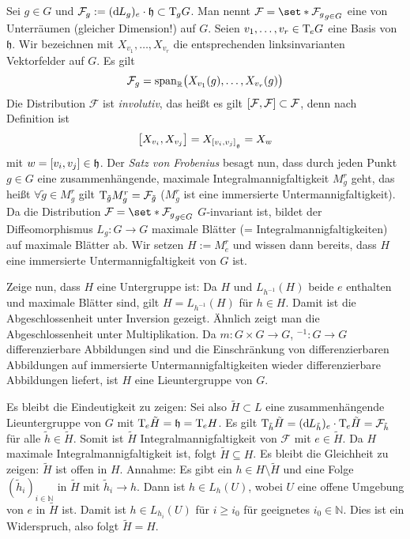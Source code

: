 \begin{beweis}
	Sei $g \in G$ und $\mathcal{F}_g := (\mathd L_g)_e \cdot \mathfrak{h} \subset \Tmap_g G$.
	Man nennt $\mathcal{F} = \set*{\mathcal{F}_g}_{g \in G}$ eine  von Unterräumen (gleicher Dimension!) auf $G$.
	Seien $v_1, \ldots ,v_r \in \Tmap_e G$ eine Basis von $\mathfrak{h}$.
	Wir bezeichnen mit $X_{v_1}, \ldots ,X_{v_r}$ die entsprechenden linksinvarianten Vektorfelder auf $G$.
	Es gilt
	\[
		\mathcal{F}_g = \Span_\mathbb{R} \enbrace[\big]{X_{v_1}(g), \ldots , X_{v_r}(g)}
	\]
	Die Distribution $\mathcal{F}$ ist \emph{involutiv}, das heißt es gilt $\benbrace*{\mathcal{F},\mathcal{F}} \subset \mathcal{F}$, denn nach Definition ist
	\[
		\benbrace[\big]{X_{v_i}, X_{v_j}} = X_{\benbrace*{v_i,v_j}_{\mathfrak{g}}} = X_w
	\]
	mit $w= \benbrace*{v_i,v_j} \in \mathfrak{h}$.
	Der \emph{Satz von Frobenius} \cite{LeeSmooth} besagt nun, dass durch jeden Punkt $g \in G$ eine zusammenhängende, maximale Integralmannigfaltigkeit $M^r_g$ geht, das heißt $\forall \tilde{g} \in M^r_g$ gilt $\Tmap_{\tilde{g}} M^r_g = \mathcal{F}_{\tilde{g}}$
	($M^r_g$ ist eine immersierte Untermannigfaltigkeit).
	Da die Distribution $\mathcal{F} = \set*{\mathcal{F}_g}_{g \in G}$ $G$-invariant ist, bildet der Diffeomorphismus $L_g \colon G \to G$ maximale Blätter (= Integralmannigfaltigkeiten) auf maximale Blätter ab.
	Wir setzen $H := M^r_e$ und wissen dann bereits, dass $H$ eine immersierte Untermannigfaltigkeit von $G$ ist.
	
	Zeige nun, dass $H$ eine Untergruppe ist:
	Da $H$ und $L_{h^{-1}}(H)$ beide $e$ enthalten und maximale Blätter sind, gilt $H=L_{h^{-1}}(H)$ für $h \in H$.
	Damit ist die Abgeschlossenheit unter Inversion gezeigt.
	Ähnlich zeigt man die Abgeschlossenheit unter Multiplikation.
	Da $m \colon G  \times G \to G$, $^{-1} \colon G \to G$ differenzierbare Abbildungen sind und die Einschränkung von differenzierbaren Abbildungen auf immersierte Untermannigfaltigkeiten wieder differenzierbare Abbildungen liefert, ist $H$ eine Lieuntergruppe von $G$.
	
	Es bleibt die Eindeutigkeit zu zeigen: 
	Sei also $\tilde{H} \subset L$ eine zusammenhängende Lieuntergruppe von $G$ mit $\Tmap_e \tilde{H} = \mathfrak{h} = \Tmap_e H$.
	Es gilt $\Tmap_{\tilde{h}} \tilde{H} = (\mathd L_{\tilde{h}})_e \cdot \Tmap_e \tilde{H}= \mathcal{F}_{\tilde{h}}$ für alle $\tilde{h} \in \tilde{H}$.
	Somit ist $\tilde{H}$ Integralmannigfaltigkeit von $\mathcal{F}$ mit $e \in \tilde{H}$.
	Da $H$ maximale Integralmannigfaltigkeit ist, folgt $\tilde{H} \subseteq H$.
	Es bleibt die Gleichheit zu zeigen:
	$\tilde{H}$ ist offen in $H$.
	Annahme: Es gibt ein $h \in H \setminus \tilde{H}$ und eine Folge $(\tilde{h}_i)_{i \in \mathbb{N}}$ in $\tilde{H}$ mit $\tilde{h}_i \to h$.
	Dann ist $h \in L_h(U)$, wobei $U$ eine offene Umgebung von $e$ in $\tilde{H}$ ist.
	Damit ist $h \in L_{h_i}(U)$ für $i \ge i_0$ für geeignetes $i_0 \in \mathbb{N}$.
	Dies ist ein Widerspruch, also folgt $\tilde{H}=H$.
\end{beweis}

